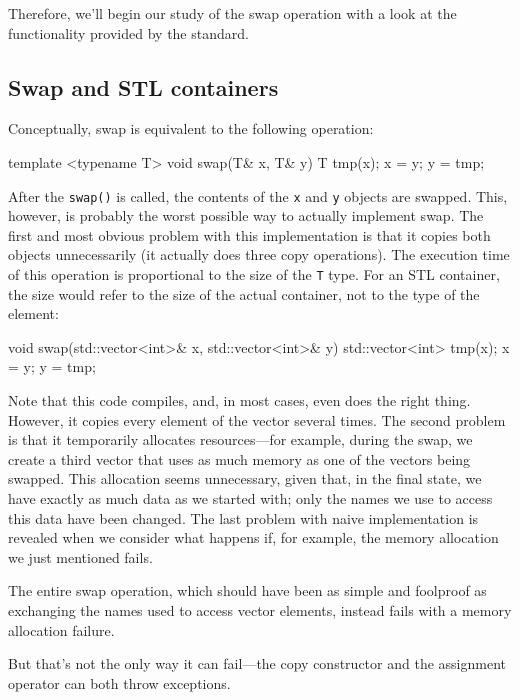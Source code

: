 Therefore, we'll begin our study of the swap operation with a look at the functionality provided by the standard.

\subsection{Swap and STL containers}

Conceptually, swap is equivalent to the following operation:

\begin{code}
template <typename T> void swap(T& x, T& y) { T tmp(x);
  x = y;
  y = tmp;
}
\end{code}

After the \texttt{swap()} is called, the contents of the \texttt{x} and \texttt{y} objects are swapped. This, however, is probably the worst possible way to actually implement swap. The first and most obvious problem with this implementation is that it copies both objects unnecessarily (it actually does three copy operations). The execution time of this operation is proportional to the size of the \texttt{T} type. For an STL container, the size would refer to the size of the actual container, not to the type of the element:

\begin{code}
void swap(std::vector<int>& x, std::vector<int>& y) {
  std::vector<int> tmp(x);
  x = y;
  y = tmp;
}
\end{code}

Note that this code compiles, and, in most cases, even does the right thing. However, it copies every element of the vector several times. The second problem is that it temporarily allocates resources---for example, during the swap, we create a third vector that uses as much memory as one of the vectors being swapped. This allocation seems unnecessary, given that, in the final state, we have exactly as much data as we started with; only the names we use to access this data have been changed. The last problem with naive implementation is revealed when we consider what happens if, for example, the memory allocation we just mentioned fails.

The entire swap operation, which should have been as simple and foolproof as exchanging the names used to access vector elements, instead fails with a memory allocation failure.

But that's not the only way it can fail---the copy constructor and the assignment operator can both throw exceptions.

